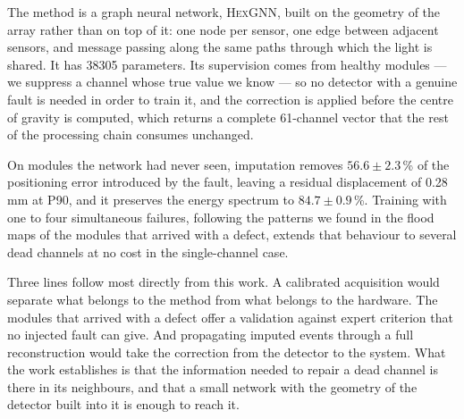 \documentclass[10pt,conference]{IEEEtran}
\begin{document}
The method is a graph neural network, \textsc{HexGNN}, built on the geometry of
the array rather than on top of it: one node per sensor, one edge between
adjacent sensors, and message passing along the same paths through which the
light is shared. It has \num{38305} parameters. Its supervision comes from
healthy modules --- we suppress a channel whose true value we know --- so no
detector with a genuine fault is needed in order to train it, and the
correction is applied before the centre of gravity is computed, which returns a
complete 61-channel vector that the rest of the processing chain consumes
unchanged.

On modules the network had never seen, imputation removes $56.6 \pm 2.3$\,\% of
the positioning error introduced by the fault, leaving a residual displacement
of 0.28\,mm at P90, and it preserves the energy spectrum to
$84.7 \pm 0.9$\,\%. Training with one to four simultaneous failures, following
the patterns we found in the flood maps of the modules that arrived with a
defect, extends that behaviour to several dead channels at no cost in the
single-channel case.

Three lines follow most directly from this work. A calibrated acquisition would
separate what belongs to the method from what belongs to the hardware. The
modules that arrived with a defect offer a validation against expert criterion
that no injected fault can give. And propagating imputed events through a full
reconstruction would take the correction from the detector to the system. What
the work establishes is that the information
needed to repair a dead channel is there in its neighbours, and that a small
network with the geometry of the detector built into it is enough to reach it.




\end{document}
